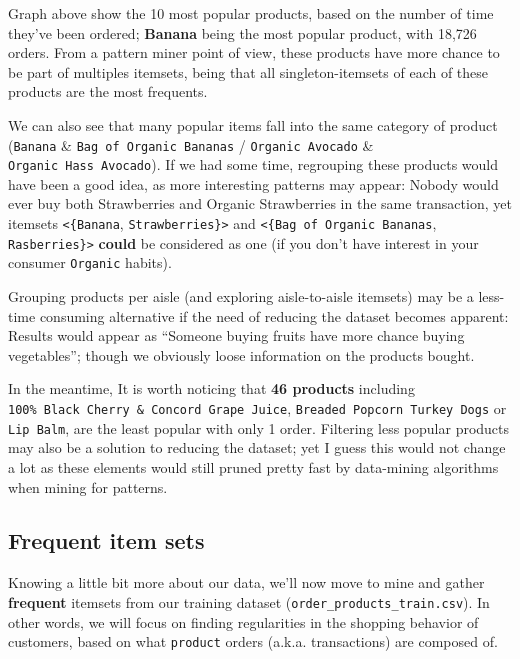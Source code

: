 \documentclass[11pt]{article}
\begin{document}
    Graph above show the 10 most popular products, based on the number of
time they've been ordered; \textbf{Banana} being the most popular
product, with 18,726 orders. From a pattern miner point of view, these
products have more chance to be part of multiples itemsets, being that
all singleton-itemsets of each of these products are the most frequents.

We can also see that many popular items fall into the same category of
product (\texttt{Banana} \& \texttt{Bag\ of\ Organic\ Bananas} /
\texttt{Organic\ Avocado} \& \texttt{Organic\ Hass\ Avocado}). If we had
some time, regrouping these products would have been a good idea, as
more interesting patterns may appear: Nobody would ever buy both
Strawberries and Organic Strawberries in the same transaction, yet
itemsets \texttt{\textless{}\{Banana},
\texttt{Strawberries\}\textgreater{}} and
\texttt{\textless{}\{Bag\ of\ Organic\ Bananas},
\texttt{Rasberries\}\textgreater{}} \textbf{could} be considered as one
(if you don't have interest in your consumer \texttt{Organic} habits).

Grouping products per aisle (and exploring aisle-to-aisle itemsets) may
be a less-time consuming alternative if the need of reducing the dataset
becomes apparent: Results would appear as ``Someone buying fruits have
more chance buying vegetables''; though we obviously loose information
on the products bought.

In the meantime, It is worth noticing that \textbf{46 products}
including \texttt{100\%\ Black\ Cherry\ \&\ Concord\ Grape\ Juice},
\texttt{Breaded\ Popcorn\ Turkey\ Dogs} or \texttt{Lip\ Balm}, are the
least popular with only 1 order. Filtering less popular products may
also be a solution to reducing the dataset; yet I guess this would not
change a lot as these elements would still pruned pretty fast by
data-mining algorithms when mining for patterns.

    \hypertarget{frequent-item-sets}{%
\subsection{Frequent item sets}\label{frequent-item-sets}}

Knowing a little bit more about our data, we'll now move to mine and
gather \textbf{frequent} itemsets from our training dataset
(\texttt{order\_products\_train.csv}). In other words, we will focus on
finding regularities in the shopping behavior of customers, based on
what \texttt{product} orders (a.k.a. transactions) are composed of.
\end{document}
